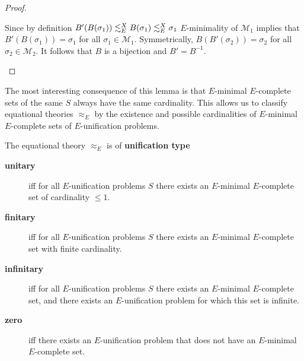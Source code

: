 \begin{proof}
\begin{center}
	\end{center}
	Since by definition $B'(B(\sigma_1))\lesssim^X_E B(\sigma_1)\lesssim^X_E\sigma_1$ $E$-minimality of $\mathcal{M}_1$ implies that $B'(B(\sigma_1))=\sigma_1$ for all $\sigma_1\in\mathcal{M}_1$. Symmetrically, $B(B'(\sigma_2))=\sigma_2$ for all $\sigma_2\in\mathcal{M}_2$. It follows that $B$ is a bijection and $B'=B^{-1}$.
	\begin{center}
	\end{center}
\end{proof}
The most interesting consequence of this lemma is that $E$-minimal $E$-complete sets of the same $S$ always have the same cardinality. This allows us to classify equational theories $\approx_E$ by the existence and possible cardinalities of $E$-minimal $E$-complete sets of $E$-unification problems.
\begin{definition}
	The equational theory $\approx_E$ is of \textbf{unification type}
	\begin{description}
		\item[\textbf{unitary}] iff for all $E$-unification problems $S$ there exists an $E$-minimal $E$-complete set of cardinality $\leq 1$.
		\item[\textbf{finitary}] iff for all $E$-unification problems $S$ there exists an $E$-minimal $E$-complete set with finite cardinality.
		\item[\textbf{infinitary}] iff for all $E$-unification problems $S$ there exists an $E$-minimal $E$-complete set, and there exists an $E$-unification problem for which this set is infinite.
		\item[\textbf{zero}] iff there exists an $E$-unification problem that does not have an $E$-minimal $E$-complete set.
	\end{description}
\end{definition}
